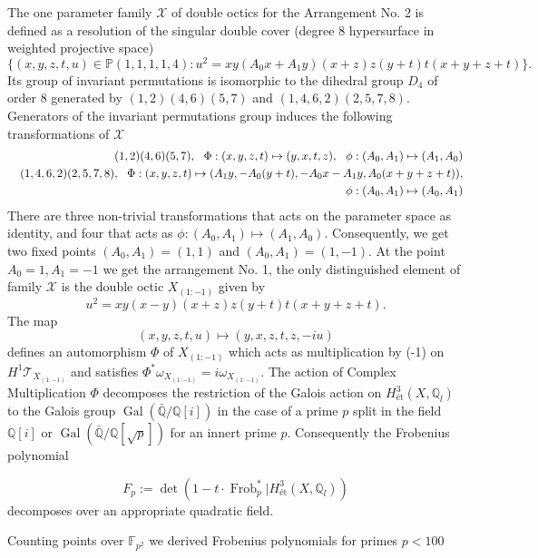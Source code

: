 \documentclass[12pt]{amsart}
\theoremstyle{plain}
\theoremstyle{remark}
\theoremstyle{definition}
\newcommand{\PP}{\mathbb P}
\numberwithin{table}{section}
\begin{document}
The one parameter family $\mathcal X$ of double octics for the Arrangement No. 2 is defined as a resolution of the singular double cover (degree 8 hypersurface in weighted projective space)
\[
\{(x,y,z,t,u)\in\PP(1,1,1,1,4): u^{2} = xy(A_{0} x + A_{1} y)(x + z)z (y + t) t (x + y + z + t)\}.
\]
Its group of invariant permutations is isomorphic to the dihedral group $D_{4}$ of order 8 generated by $(1,2)(4,6)(5,7)$ and $(1,4,6,2)(2,5,7,8)$. Generators of the invariant permutations group induces the following transformations of $\mathcal X$
\begin{eqnarray*}
	&&(1,2)(4,6)(5,7),\ \  \Phi: (x,y,z,t)\mapsto(y,x,t,z),\ \  \phi:(A_{0},A_{1}) \mapsto (A_{1},A_{0})\\
	&&(1,4,6,2)(2,5,7,8),\ \  \Phi: (x,y,z,t)\mapsto(A_{1}y,-A_{0}(y+t), -A_{0}x-A_{1}y, A_{0}(x+y+z+t)),\\  &&\rule{3.9cm}{0cm}\phi:(A_{0},A_{1}) \mapsto (A_{0},A_{1	})
\end{eqnarray*}
There are three non-trivial transformations that acts on the parameter space as identity, and four that acts as $\phi:(A_{0},A_{1}) \mapsto (A_{1},A_{0})$.
Consequently, we get two fixed points $(A_{0},A_{1}) = (1,1)$ and $(A_{0},A_{1}) = (1,-1)$.
At the point $A_{0}=1,A_{1}=-1$ we get the arrangement No. 1, the only distinguished element of family $\mathcal X$ is the double octic $X_{(1:-1)}$ given by
\[
 u^{2} = xy(x - y)(x + z)z (y + t) t (x + y + z + t).
\]
The map
\[
(x,y,z,t,u)\mapsto (y,x,z,t,z,-iu)
\]
defines an automorphism $\Phi$ of $X_{(1:-1)}$ which acts as multiplication by (-1) on $H^{1}\mathcal T_{X_{(1:-1)}}$ and satisfies $\Phi^{*}\omega_{X_{(1:-1)}} = i \omega_{X_{(1:-1)}}$.	The action of Complex Multiplication $\Phi$ decomposes the restriction of the Galois action on $H^{3}_{\text{\'et}}(X,\mathbb Q_{l})$ to the Galois group
$\operatorname{Gal}(\bar{\mathbb Q}/\mathbb Q[i])$ in the case of a prime $p$ split in the field $\mathbb Q[i]$
or $\operatorname{Gal}(\bar{\mathbb Q}/\mathbb Q[\sqrt{p}])$ for an innert prime $p$.
Consequently the Frobenius polynomial

\[F_{p} := \det(1-t\cdot \operatorname{Frob}^{*}_{p}|H^{3}_{\text{\'et}}(X,\mathbb Q_{l}))\]
decomposes over an appropriate quadratic field.

Counting points over $\mathbb F_{p^{2}}$ we derived Frobenius polynomials for primes $p<100$
\end{document}
